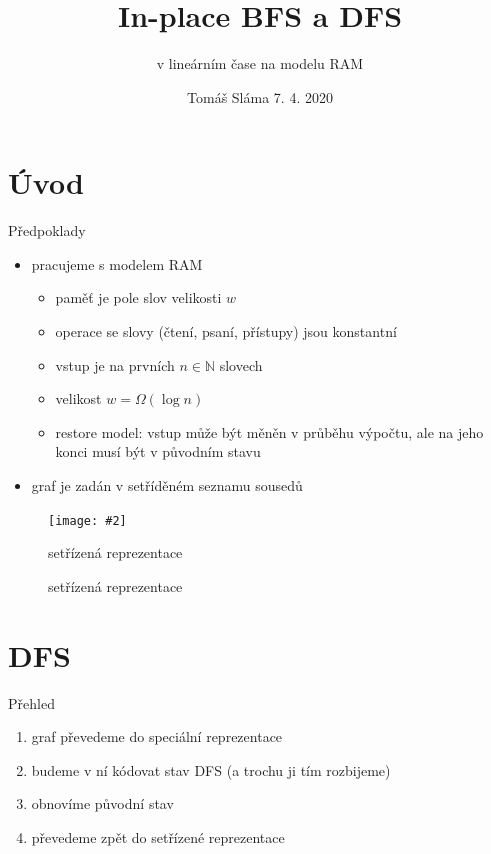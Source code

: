 \documentclass[czech]{beamer}
\title{In-place BFS a DFS}
\subtitle{v lineárním čase na modelu RAM}
\date{Tomáš Sláma \hfill 7. 4. 2020}
\makeatletter
\newcommand{\fitimage}[2][\@nil]{
	\begin{figure}
		\begin{adjustbox}{width=0.9\textwidth, totalheight=\textheight-2\baselineskip-2\baselineskip,keepaspectratio}
			\texttt{[image: \#2]}
		\end{adjustbox}
		\def\tmp{#1}%
	 \ifx\tmp\@nnil
			\else
			\caption{#1}
		\fi
	\end{figure}
}
\makeatother
\begin{document}
	\begin{frame}
		\maketitle
	\end{frame}
	
	\section{Úvod}
	\begin{frame}{Předpoklady}
		\begin{itemize}
			\item pracujeme s modelem RAM
			\begin{itemize}
				\item paměť je pole slov velikosti $w$
				\item operace se slovy (čtení, psaní, přístupy) jsou konstantní
				\item vstup je na prvních $n \in \mathbb{N}$ slovech
				\item velikost $w = \Omega\left(\log n\right)$
				\item restore model: vstup může být měněn v průběhu výpočtu, ale na jeho konci musí být v původním stavu
			\end{itemize}
			\item graf je zadán v setříděném seznamu sousedů
		\end{itemize}

		\fitimage[setřízená reprezentace]{images/sorted.png}
	\end{frame}

	\section{DFS}

	\begin{frame}{Přehled}
		\begin{enumerate}
			\item graf převedeme do speciální reprezentace
			\item budeme v ní kódovat stav DFS (a trochu ji tím rozbijeme)
			\item obnovíme původní stav
			\item převedeme zpět do setřízené reprezentace
		\end{enumerate}
	\end{frame}
\end{document}
